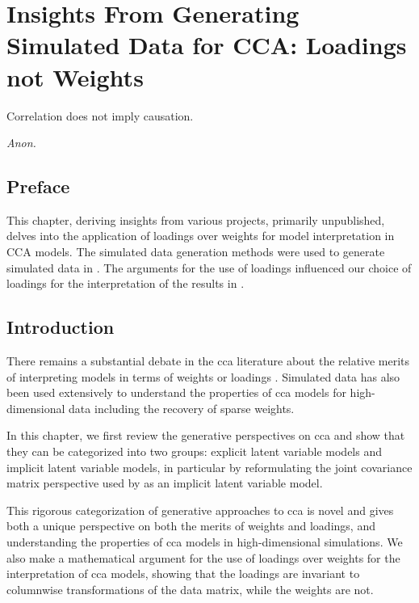 \graphicspath{{chapters/loadings/}}


\chapter{Insights From Generating Simulated Data for CCA: Loadings not Weights}\label{chap:loadings}
\epigraph{Correlation does not imply causation.}{\textit{Anon.}}
\minitoc
\section*{Preface}

This chapter, deriving insights from various projects, primarily unpublished, delves into the application of loadings over weights for model interpretation in CCA models. The simulated data generation methods were used to generate simulated data in \citet{mihalik2022canonical}. The arguments for the use of loadings influenced our choice of loadings for the interpretation of the results in \citet{}.

\section{Introduction}

There remains a substantial debate in the \acrshort{cca} literature about the relative merits of interpreting models in terms of weights or loadings \citep{gu2018simultaneous}.
Simulated data has also been used extensively to understand the properties of \acrshort{cca} models for high-dimensional data \citep{chen2013sparse, suo2017sparse, helmer2020stability} including the recovery of sparse weights.

In this chapter, we first review the generative perspectives on \acrshort{cca} and show that they can be categorized into two groups: explicit latent variable models and implicit latent variable models, in particular by reformulating the joint covariance matrix perspective used by \citet{suo2017sparse, chen2013sparse, helmer2020stability} as an implicit latent variable model.

This rigorous categorization of generative approaches to \acrshort{cca} is novel and gives both a unique perspective on both the merits of weights and loadings, and understanding the properties of \acrshort{cca} models in high-dimensional simulations.
We also make a mathematical argument for the use of loadings over weights for the interpretation of \acrshort{cca} models, showing that the \gls{loadings} are invariant to columnwise transformations of the data matrix, while the weights are not.

